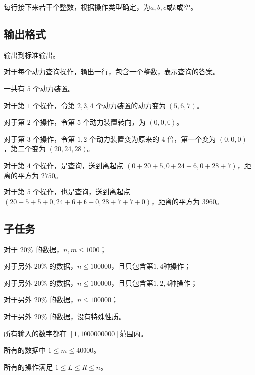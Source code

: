 每行接下来若干个整数，根据操作类型确定，为$a,b,c$或$k$或空。


\subsection*{输出格式}

输出到标准输出。

对于每个动力查询操作，输出一行，包含一个整数，表示查询的答案。

\examplebox*{}{}

一共有 $5$ 个动力装置。

对于第 $1$ 个操作，令第 $2,3,4$ 个动力装置的动力变为 $(5,6,7)$。

对于第 $2$ 个操作，令第 $5$ 个动力装置转向，为 $(0,0,0)$。

对于第 $3$ 个操作，令第 $1,2$ 个动力装置变为原来的 $4$ 倍，第一个变为 $(0,0,0)$ ，第二个变为 $(20,24,28)$。

对于第 $4$ 个操作，是查询，送到离起点 $(0+20+5,0+24+6,0+28+7)$，距离的平方为 $2750$。

对于第 $5$ 个操作，也是查询，送到离起点 $(20+5+5+0,24+6+6+0,28+7+7+0)$，距离的平方为 $3960$。

\subsection*{子任务}

对于 $20\%$ 的数据，$n,m\leq 1000$；

对于另外 $20\%$ 的数据，$n\leq 100000$，且只包含第$1,4$种操作；

对于另外 $20\%$ 的数据，$n\leq 100000$，且只包含第$1,2,4$种操作；

对于另外 $20\%$ 的数据，$n\leq 100000$；

对于另外 $20\%$ 的数据，没有特殊性质。

所有输入的数字都在 $[1,1000000000]$范围内。

所有的数据中 $1\leq m\leq 40000$。

所有的操作满足 $1\leq L\leq R\leq n$。
